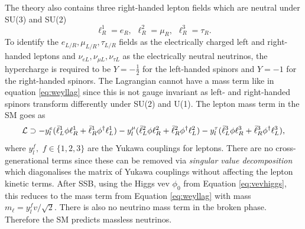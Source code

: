 The theory also contains three right-handed lepton fields which are neutral under SU(3) and SU(2)
\begin{equation}
    \ell^1_R=e_R,\hspace{5pt}\ell^2_R=\mu_R,\hspace{5pt}\ell^3_R=\tau_R.
\end{equation}
To identify the $e_{L/R},\mu_{L/R},\tau_{L/R}$ fields as the electrically charged left and right-handed leptons and $\nu_{eL},\nu_{\mu L},\nu_{\tau L}$ as the electrically neutral neutrinos, the hypercharge is required to be $Y=-\frac{1}{2}$ for the left-handed spinors and $Y=-1$ for the right-handed spinors. The Lagrangian cannot have a mass term like in equation \ref{eq:weyllag} since this is not gauge invariant as left- and right-handed spinors transform differently under SU(2) and U(1). The lepton mass term in the SM goes as
\begin{equation}\label{eq:yukawalep}
    \mathcal{L}\supset-y_l^e(\bar{\ell}_L^1\phi\ell^1_R+\bar{\ell}^1_R\phi^{\dagger}\ell^1_L)-y_l^\mu(\bar{\ell}_L^2\phi\ell^2_R+\bar{\ell}^2_R\phi^{\dagger}\ell^2_L)-y_l^\tau(\bar{\ell}_L^3\phi\ell^3_R+\bar{\ell}^3_R\phi^{\dagger}\ell^3_L),
\end{equation}
where $y_l^f,$ $f\in\{1,2,3\}$ are the Yukawa couplings for leptons. There are no cross-generational terms since these can be removed via \textit{singular value decomposition} which diagonalises the matrix of Yukawa couplings without affecting the lepton kinetic terms. After SSB, using the Higgs vev $\phi_0$ from Equation \ref{eq:vevhiggs}, this reduces to the mass term from Equation \ref{eq:weyllag} with mass $m_\ell=y_{l}^fv/\sqrt{2}$. There is also no neutrino mass term in the broken phase. Therefore the SM predicts massless neutrinos. 

